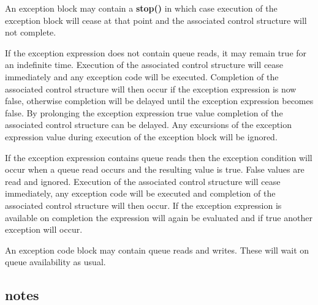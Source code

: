             An exception block may contain a {\bf stop()} in which case
            execution of the exception block will cease at that point and the
            associated control structure will not complete.

            If the exception expression does not contain queue reads, it may
            remain true for an indefinite time. Execution of the associated
            control structure will cease immediately and any exception code will
            be executed. Completion of the associated control structure will
            then occur if the exception expression is now false, otherwise
            completion will be delayed until the exception expression becomes
            false. By prolonging the exception expression true value completion
            of the associated control structure can be delayed. Any excursions
            of the exception expression value during execution of the exception
            block will be ignored.

            If the exception expression contains queue reads then the exception
            condition will occur when a queue read occurs and the resulting value
            is true. False values are read and ignored. Execution of the
            associated control structure will cease immediately, any exception
            code will be executed and completion of the associated control
            structure will then occur. If the exception expression is available
            on completion the expression will again be evaluated and if true
            another exception will occur.

            An exception code block may contain queue reads and writes. These
            will wait on queue availability as usual.

        \subsection{notes}
        
